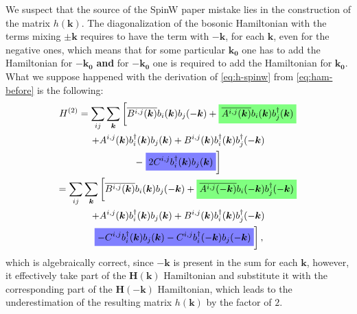 \documentclass[a4paper,12pt]{article}
\newcommand{\highlightgreen}[1]{%
  \colorbox{green!50}{$\displaystyle#1$}}
\newcommand{\highlightblue}[1]{%
  \colorbox{blue!50}{$\displaystyle#1$}}
\begin{document}
            We suspect that the source of the SpinW paper \cite{toth2015linear} mistake lies in the construction of the matrix $h(\boldsymbol{k})$. 
            The diagonalization of the bosonic Hamiltonian with the terms mixing $\pm\boldsymbol{k}$
            requires to have the term with $-\boldsymbol{k}$, for each $\boldsymbol{k}$, even for the negative ones, 
            which means that for some particular $\boldsymbol{k_0}$ one has to add the Hamiltonian for $-\boldsymbol{k_0}$ \textbf{and} 
            for $-\boldsymbol{k_0}$ one is required to add the Hamiltonian for $\boldsymbol{k_0}$. What we suppose happened with the derivation of \eqref{eq:h-spinw} 
            from \eqref{eq:ham-before} is the following:
            \begin{multline}
                H^{(2)} = \sum_{ij}\sum_{\boldsymbol{k}}\left[\overline{B^{i,j}(\boldsymbol{k})}b_{i}(\boldsymbol{k})b_{j}(-\boldsymbol{k}) +
                \highlightgreen{\overline{A^{i,j}(\boldsymbol{k})}b_{i}(\boldsymbol{k})b^{\dag}_{j}(\boldsymbol{k})}\right. \\+ 
                A^{i,j}(\boldsymbol{k})b^{\dag}_{i}(\boldsymbol{k})b_{j}(\boldsymbol{k}) +
                B^{i,j}(\boldsymbol{k})b^{\dag}_{i}(\boldsymbol{k})b^{\dag}_{j}(-\boldsymbol{k}) \\-
                \left.\highlightblue{2 C^{i,j}b^{\dag}_{i}(\boldsymbol{k})b_{j}(\boldsymbol{k})}\right]\\
                = \sum_{ij}\sum_{\boldsymbol{k}}\left[\overline{B^{i,j}(\boldsymbol{k})}b_{i}(\boldsymbol{k})b_{j}(-\boldsymbol{k}) +
                \highlightgreen{\overline{A^{i,j}(-\boldsymbol{k})}b_{i}(-\boldsymbol{k})b^{\dag}_{j}(-\boldsymbol{k})}\right. \\+ 
                A^{i,j}(\boldsymbol{k})b^{\dag}_{i}(\boldsymbol{k})b_{j}(\boldsymbol{k}) +
                B^{i,j}(\boldsymbol{k})b^{\dag}_{i}(\boldsymbol{k})b^{\dag}_{j}(-\boldsymbol{k}) \\
                \left.\highlightblue{ -C^{i,j}b^{\dag}_{i}(\boldsymbol{k})b_{j}(\boldsymbol{k}) - C^{i,j}b^{\dag}_{i}(-\boldsymbol{k})b_{j}(-\boldsymbol{k})}\right],\\
            \end{multline}
            which is algebraically correct, since $-\boldsymbol{k}$ is present in the sum for each $\boldsymbol{k}$, however, 
            it effectively take part of the $\boldsymbol{H}(\boldsymbol{k})$ Hamiltonian and substitute it with the corresponding part of the $\boldsymbol{H}(-\boldsymbol{k})$ Hamiltonian, 
            which leads to the underestimation of the resulting matrix $h(\boldsymbol{k})$ by the factor of $2$.
\end{document}
